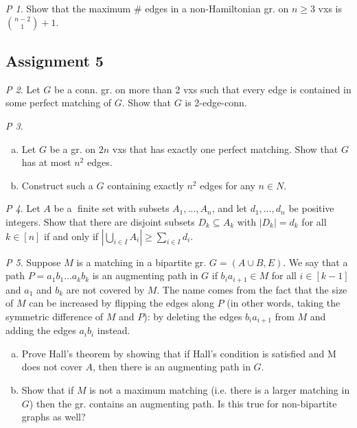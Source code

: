 \documentclass[11pt, fleqn, a4paper, landscape]{article}
\theoremstyle{plain} %
\theoremstyle{remark} %
\newtheorem{problem}{P}
\theoremstyle{definition} %
\begin{document}
\begin{multicols}{5}
\begin{problem}
Show that the maximum \# edges in a non-Hamiltonian gr. on $n \ge 3$
vxs is $\binom{n-2}{1}+1$.
\end{problem}

\subsection{Assignment 5}

\begin{problem}
Let $G$ be a conn. gr. on more than 2 vxs such that every edge is
contained in some perfect matching of $G$. Show that $G$ is 2-edge-conn.
\end{problem}

\begin{problem}
\begin{enumerate}[(a)]
\item Let $G$ be a gr. on $2n$ vxs that has exactly one perfect matching. Show that $G$ has at most $n^2$ edges.
\item Construct such a $G$ containing exactly $n^2$ edges for any $n \in N$.
\end{enumerate}
\end{problem}

\begin{problem}
Let $A$ be a finite set with subsets $A_1,\dots, A_n$, and let $d_1,\dots, d_n$ be positive integers. Show that there are disjoint subsets $D_k \subseteq A_k$ with $|D_k| = d_k$ for all $k \in [n]$ if and
only if $|\bigcup_{i\in I}A_i|\ge \sum_{i\in I}d_i$.
\end{problem}

\begin{problem}
Suppose $M$ is a matching in a bipartite gr. $G = (A\cup B,E)$. We say that a path $P = a_1b_1\dots a_kb_k$ is an augmenting path in $G$ if $b_ia_{i+1}\in M$ for all $i\in [k - 1]$ and $a_1$ and $b_k$ are not covered by $M$. The name comes from the fact that the size of $M$ can be increased
by 
flipping the edges along $P$ (in other words, taking the symmetric difference of $M$ and $P$): by deleting the edges $b_ia_{i+1}$ from $M$ and adding the edges $a_ib_i$ instead.
\begin{enumerate}[(a)]
\item Prove Hall's theorem by showing that if Hall's condition is satisfied and M does not cover $A$, then there is an augmenting path in $G$.
\item Show that if $M$ is not a maximum matching (i.e. there is a larger matching in $G$) then the gr. contains an augmenting path. Is this true for non-bipartite graphs as well?
\end{enumerate}
\end{problem}


\end{multicols}
\end{document}
